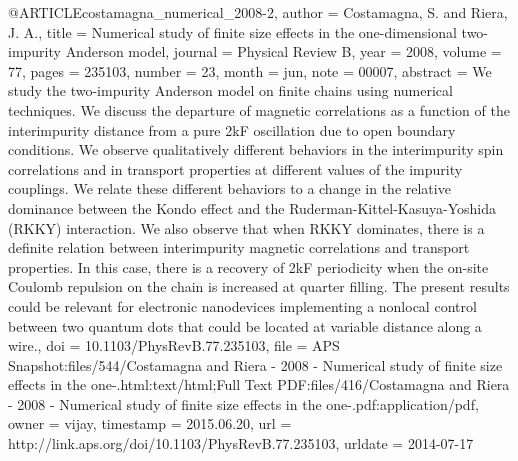@ARTICLE{costamagna_numerical_2008-2,
  author = {Costamagna, S. and Riera, J. A.},
  title = {Numerical study of finite size effects in the one-dimensional two-impurity
	{Anderson} model},
  journal = {Physical Review B},
  year = {2008},
  volume = {77},
  pages = {235103},
  number = {23},
  month = jun,
  note = {00007},
  abstract = {We study the two-impurity Anderson model on finite chains using numerical
	techniques. We discuss the departure of magnetic correlations as
	a function of the interimpurity distance from a pure 2kF oscillation
	due to open boundary conditions. We observe qualitatively different
	behaviors in the interimpurity spin correlations and in transport
	properties at different values of the impurity couplings. We relate
	these different behaviors to a change in the relative dominance between
	the Kondo effect and the Ruderman-Kittel-Kasuya-Yoshida (RKKY) interaction.
	We also observe that when RKKY dominates, there is a definite relation
	between interimpurity magnetic correlations and transport properties.
	In this case, there is a recovery of 2kF periodicity when the on-site
	Coulomb repulsion on the chain is increased at quarter filling. The
	present results could be relevant for electronic nanodevices implementing
	a nonlocal control between two quantum dots that could be located
	at variable distance along a wire.},
  doi = {10.1103/PhysRevB.77.235103},
  file = {APS Snapshot:files/544/Costamagna and Riera - 2008 - Numerical study of finite size effects in the one-.html:text/html;Full Text PDF:files/416/Costamagna and Riera - 2008 - Numerical study of finite size effects in the one-.pdf:application/pdf},
  owner = {vijay},
  timestamp = {2015.06.20},
  url = {http://link.aps.org/doi/10.1103/PhysRevB.77.235103},
  urldate = {2014-07-17}
}

